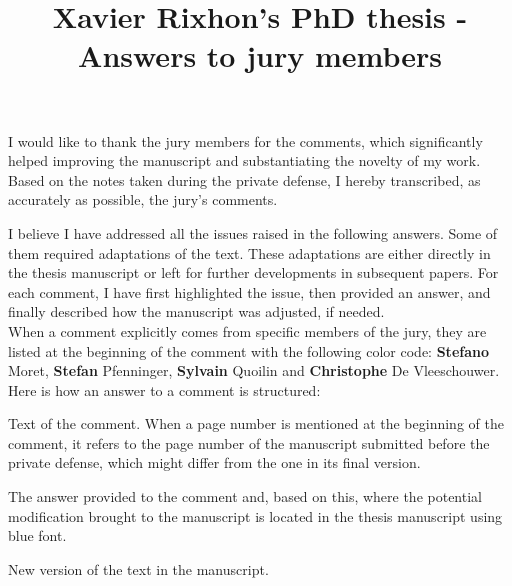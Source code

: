 \documentclass[12pt,a4paper]{article}
\title{\vspace{-1cm}
\begin{flushleft} {\sffamily Xavier Rixhon's PhD thesis - Answers to jury members}\end{flushleft}}
\date{\vspace{-1.7cm}\begin{flushleft}\sffamily Exploration of uncertainty-aware energy transition pathways - Reinforcement learning and principal component analysis-based methods\end{flushleft}}
\newcommand{\clearemptydoublepage}{\newpage{\pagestyle{empty}\cleardoublepage}} %
\begin{document}
\maketitle

I would like to thank the jury members for the comments, which significantly helped improving the manuscript and substantiating the novelty of my work. Based on the notes taken during the private defense, I hereby transcribed, as accurately as possible, the jury's comments. 

I believe I have addressed all the issues raised in the following answers. Some of them required adaptations of the text. These adaptations are either directly in the thesis manuscript or left for further developments in subsequent papers. For each comment, I have first highlighted the issue, then provided an answer, and finally described how the manuscript was adjusted, if needed.\\

When a comment explicitly comes from specific members of the jury, they are listed at the beginning of the comment with the following color code: {\color{orange} \textbf{Stefano} Moret}, {\color{teal} \textbf{Stefan} Pfenninger}, {\color{purple} \textbf{Sylvain} Quoilin} and {\color{violet} \textbf{Christophe} De Vleeschouwer}. Here is how an answer to a comment is structured:

\begin{mdframed}[style=comment] %
Text of the comment. When a page number is mentioned at the beginning of the comment, it refers to the page number of the manuscript submitted before the private defense, which might differ from the one in its final version.
\end{mdframed}

\noindent The answer provided to the comment and, based on this, where the potential modification brought to the manuscript is located in the thesis manuscript using {\color{blue} blue font}.

\begin{mdframed}[style=manuscript] %
New version of the text in the manuscript.
\end{mdframed}


\clearpage
\tableofcontents

\clearemptydoublepage
\end{document}
